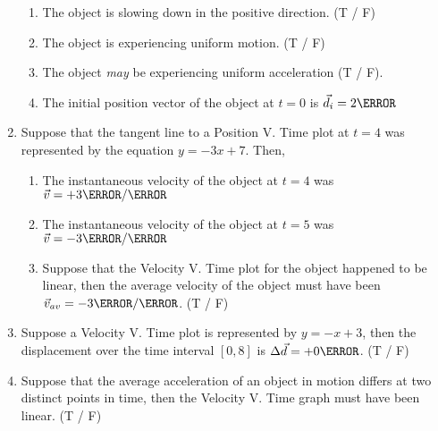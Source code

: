 \documentclass[12pt]{article} %
\begin{document}
\begin{qstn}[1]
\begin{enumerate}
\begin{enumerate}[label = (\alph*)]
                \item The object is slowing down in the positive direction. (T / F)
                \item The object is experiencing uniform motion. (T / F)
                \item The object \emph{may} be experiencing uniform acceleration (T / F).
                \item The initial position vector of the object at $t = 0$ is $\vec d_i = 2 \m$
            \end{enumerate}
        \item Suppose that the tangent line to a Position V. Time plot at $t = 4$ was represented by the equation $y = -3x + 7$. Then,
            \begin{enumerate}[label = (\alph*)]
                \item The instantaneous velocity of the object at $t = 4$ was $\vec v = +3 \m / \s$
                \item The instantaneous velocity of the object at $t = 5$ was $\vec v = -3 \m / \s$
                \item Suppose that the Velocity V. Time plot for the object happened to be linear, then the average velocity of the object must have been $\vec v_{av} = -3\m / \s$. (T / F)
            \end{enumerate}
        \item Suppose a Velocity V. Time plot is represented by $y = -x + 3$, then the displacement over the time interval $[0,8]$ is $\Delta \vec d = +0 \m$. (T / F)
        \item Suppose that the average acceleration of an object in motion differs at two distinct points in time, then the Velocity V. Time graph must have been linear. (T / F)

    \end{enumerate}

 \end{qstn}
\end{document}
